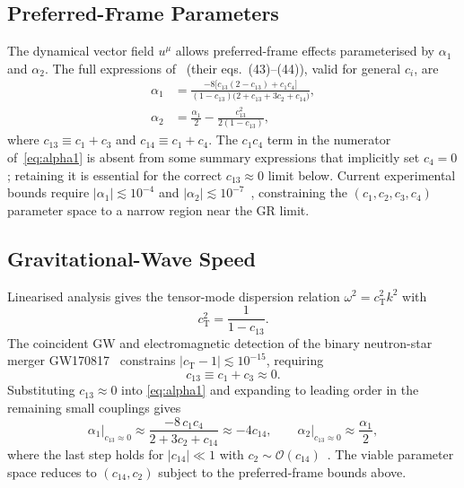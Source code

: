 \documentclass[12pt,a4paper]{article}
\newcommand{\cT}{c_{\mathrm{T}}}
\begin{document}
\subsection{Preferred-Frame Parameters}


The dynamical vector field $u^{\mu}$ allows preferred-frame effects
parameterised by $\alpha_{1}$ and $\alpha_{2}$. The full expressions
of~\citet{foster2006} (their eqs.~(43)--(44)), valid for general $c_{i}$, are
\begin{align}
  \alpha_{1} &= \frac{-8\bigl[c_{13}(2-c_{13})+c_{1}c_{4}\bigr]}
                    {(1-c_{13})\bigl(2+c_{13}+3c_{2}+c_{14}\bigr)},
  \label{eq:alpha1}\\[4pt]
  \alpha_{2} &= \frac{\alpha_{1}}{2}
               -\frac{c_{13}^{2}}{2(1-c_{13})},
  \label{eq:alpha2}
\end{align}
where $c_{13}\equiv c_{1}+c_{3}$ and $c_{14}\equiv c_{1}+c_{4}$.
The $c_{1}c_{4}$ term in the numerator of~\eqref{eq:alpha1} is absent from
some summary expressions that implicitly set $c_{4}=0$; retaining it is
essential for the correct $c_{13}\approx 0$ limit below.
Current experimental bounds require $|\alpha_{1}|\lesssim 10^{-4}$ and
$|\alpha_{2}|\lesssim 10^{-7}$~\citep{will2014,oost2018}, constraining the
$(c_{1},c_{2},c_{3},c_{4})$ parameter space to a narrow region near the
GR limit.

\subsection{Gravitational-Wave Speed}

Linearised analysis gives the tensor-mode dispersion relation
$\omega^{2}=\cT^{2}k^{2}$ with
\begin{equation}
  \cT^{2}=\frac{1}{1-c_{13}}.
  \label{eq:cT}
\end{equation}
The coincident GW and electromagnetic detection of the binary neutron-star
merger GW170817~\citep{abbott2017gw,abbott2017mm} constrains
$|\cT-1|\lesssim 10^{-15}$, requiring
\begin{equation}
  c_{13}\equiv c_{1}+c_{3}\approx 0.
  \label{eq:c13constraint}
\end{equation}
Substituting $c_{13}\approx 0$ into \cref{eq:alpha1} and expanding to
leading order in the remaining small couplings gives
\begin{equation}
  \alpha_{1}\big|_{c_{13}\approx 0}
  \approx \frac{-8\,c_{1}c_{4}}{2+3c_{2}+c_{14}}
  \approx -4c_{14},
  \qquad
  \alpha_{2}\big|_{c_{13}\approx 0}\approx\frac{\alpha_{1}}{2},
  \label{eq:alpha_limit}
\end{equation}
where the last step holds for $|c_{14}|\ll 1$ with $c_{2}\sim
\mathcal{O}(c_{14})$~\citep{foster2006,oost2018}. The viable parameter space
reduces to $(c_{14},c_{2})$ subject to the preferred-frame bounds above.
\end{document}
